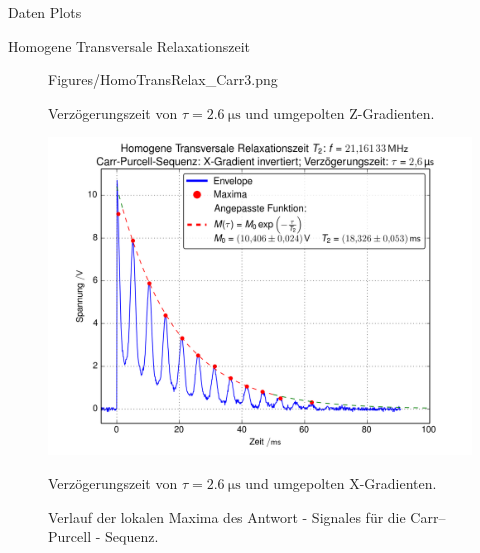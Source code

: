 \begin{appendix}
\begin{chapter}{Daten Plots}
\begin{section}{Homogene Transversale Relaxationszeit}
\begin{subsection}
\begin{figure}[htb!]
\begin{minipage}{.48\textwidth}
            {Figures/HomoTransRelax_Carr3.png}
            \caption{Verzögerungszeit von
              $\tau = \SI{2.6}{\micro\second}$ und umgepolten Z-Gradienten.}
            \label{AnhangfigCarr3}
          \end{minipage}\quad
          \begin{minipage}{.48\textwidth}
            \centering
            \includegraphics[width=\textwidth]
            {Figures/HomoTransRelax_Carr4.png}
            \caption{Verzögerungszeit von
              $\tau = \SI{2.6}{\micro\second}$ und umgepolten X-Gradienten.}
            \label{AnhangfigCarr4}
          \end{minipage}
          \caption{Verlauf der lokalen Maxima des Antwort - Signales für die
            Carr--Purcell - Sequenz.}
        \end{figure}
        
      \end{subsection}
      

\end{section}
\end{chapter}
\end{appendix}
